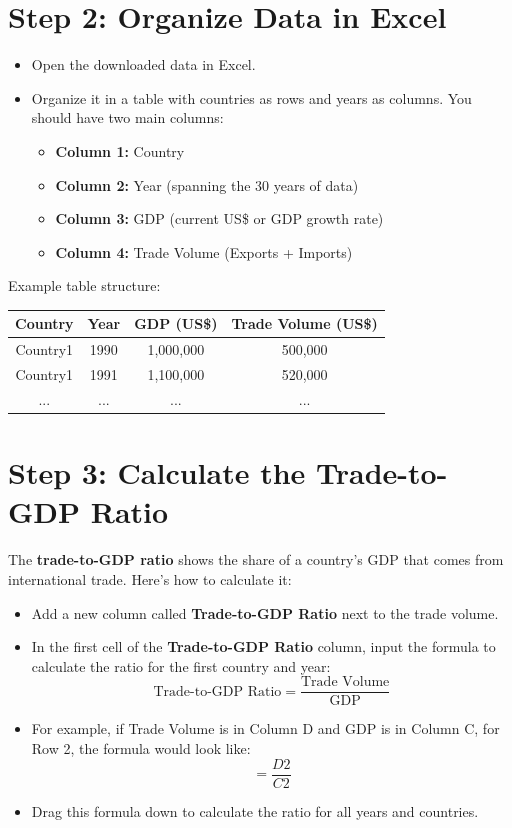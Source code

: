 \documentclass{article}
\begin{document}
\section{Step 2: Organize Data in Excel}
\begin{itemize}
    \item Open the downloaded data in Excel.
    \item Organize it in a table with countries as rows and years as columns. You should have two main columns:
    \begin{itemize}
        \item \textbf{Column 1:} Country
        \item \textbf{Column 2:} Year (spanning the 30 years of data)
        \item \textbf{Column 3:} GDP (current US\$ or GDP growth rate)
        \item \textbf{Column 4:} Trade Volume (Exports + Imports)
    \end{itemize}
\end{itemize}

Example table structure:

\begin{center}
\begin{tabular}{|c|c|c|c|}
\hline
Country & Year & GDP (US\$) & Trade Volume (US\$) \\
\hline
Country1 & 1990 & 1,000,000 & 500,000 \\
Country1 & 1991 & 1,100,000 & 520,000 \\
... & ... & ... & ... \\
\hline
\end{tabular}
\end{center}

\section{Step 3: Calculate the Trade-to-GDP Ratio}
The \textbf{trade-to-GDP ratio} shows the share of a country’s GDP that comes from international trade. Here's how to calculate it:

\begin{itemize}
    \item Add a new column called \textbf{Trade-to-GDP Ratio} next to the trade volume.
    \item In the first cell of the \textbf{Trade-to-GDP Ratio} column, input the formula to calculate the ratio for the first country and year:
    \[
    \text{Trade-to-GDP Ratio} = \frac{\text{Trade Volume}}{\text{GDP}}
    \]
    \item For example, if Trade Volume is in Column D and GDP is in Column C, for Row 2, the formula would look like:
    \[
    = \frac{D2}{C2}
    \]
    \item Drag this formula down to calculate the ratio for all years and countries.
\end{itemize}
\end{document}
